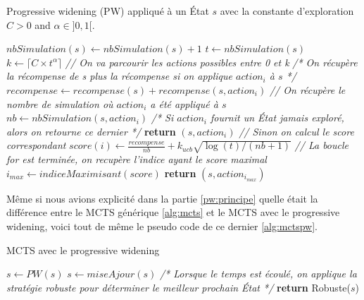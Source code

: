 \documentclass[pdftex,french, english]{article}	%
\begin{document}
		\begin{algorithm}[H]
			\caption{Progressive widening (PW) appliqué à un État $s$ avec la constante d'exploration $C > 0$ and $\alpha \in ]0, 1[$.}
			\label{alg:spw}
				\begin{algorithmic}[1]
						\State $nbSimulation(s) \gets nbSimulation(s) + 1$ 
						\State $t \gets nbSimulation(s)$
						\State $k \gets \lceil{C \times t^{\alpha}}\rceil$
						\State \textit{// On va parcourir les actions possibles entre 0 et k}
							\State \textit{/* On récupère la récompense de s plus la récompense si on applique $action_{i}$ à $s$ */}
							\State $recompense \gets recompense(s) + recompense(s, action_{i})$
							\State \textit{// On récupère le nombre de simulation où $action_{i}$ a été appliqué à $s$}
							\State $nb \gets nbSimulation(s, action_{i})$
								\State \textit{/* Si $action_{i}$ fournit un État jamais exploré, alors on retourne ce dernier */}
								\State \textbf{return} $(s, action_{i})$
							\Else
								\State \textit{// Sinon on calcul le score correspondant}
								\State $score(i) \gets \frac{recompense}{nb} + \textbf{$k_{ucb}$}\sqrt{\log(t)/(nb + 1)}$							
							\EndIf
						\EndFor
						\State \textit{// La boucle for est terminée, on recupère l'indice ayant le score maximal}
						\State $i_{max} \gets indiceMaximisant(score)$
						\State \textbf{return} $(s, action_{i_{max}})$
					\EndFunction
				\end{algorithmic}
		\end{algorithm}

		Même si nous avions explicité dans la partie \ref{pw:principe} quelle était la différence entre le MCTS générique \ref{alg:mcts} et le MCTS avec le progressive widening, voici tout de même le pseudo code de ce dernier \ref{alg:mctspw}.

		\begin{algorithm}[H]
			\caption{MCTS avec le progressive widening}
			\label{alg:mctspw}
				\begin{algorithmic}[1]
								\State $s \gets PW(s)$ 
							\EndWhile
						\State $s \gets miseAjour(s)$
						\EndWhile
						\State \textit{/* Lorsque le temps est écoulé, on applique la stratégie robuste pour déterminer le meilleur prochain État */}
					\State \textbf{return} Robuste($s$)
					\EndFunction
				\end{algorithmic}
		\end{algorithm}
\end{document}
